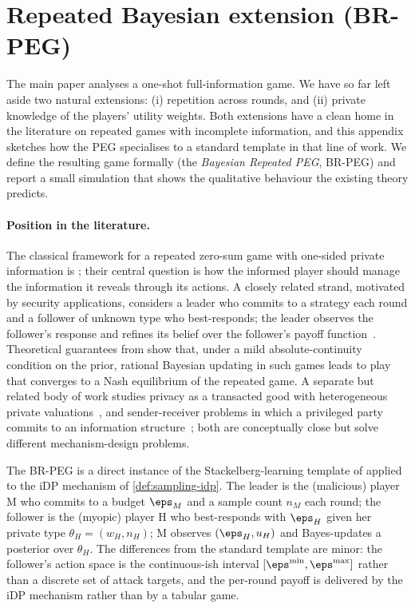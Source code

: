 \section{Repeated Bayesian extension (BR-PEG)}
\label{app:bayesian}

The main paper analyses a one-shot full-information game. We have so far
left aside two natural extensions: (i) repetition across rounds, and (ii)
private knowledge of the players' utility weights. Both extensions have a
clean home in the literature on repeated games with incomplete
information, and this appendix sketches how the PEG specialises to a
standard template in that line of work. We define the resulting game
formally (the \emph{Bayesian Repeated PEG}, BR-PEG) and report a small
simulation that shows the qualitative behaviour the existing theory
predicts.

\paragraph{Position in the literature.}
The classical framework for a repeated zero-sum game with one-sided
private information is \citet{aumann1995repeated}; their central question
is how the informed player should manage the information it reveals
through its actions. A closely related strand, motivated by security
applications, considers a leader who commits to a strategy each round and
a follower of unknown type who best-responds; the leader observes the
follower's response and refines its belief over the follower's payoff
function~\cite{letchford2009learning, blum2014learning,
balcan2015commitment}. Theoretical guarantees from
\citet{kalai1993rational} show that, under a mild absolute-continuity
condition on the prior, rational Bayesian updating in such games leads to
play that converges to a Nash equilibrium of the repeated game. A
separate but related body of work studies privacy as a transacted good
with heterogeneous private valuations~\cite{ghosh2011selling}, and
sender-receiver problems in which a privileged party commits to an
information structure~\cite{kamenica2011bayesian}; both are conceptually
close but solve different mechanism-design problems.

The BR-PEG is a direct instance of the Stackelberg-learning template of
\citet{letchford2009learning, blum2014learning, balcan2015commitment}
applied to the iDP mechanism of \cref{def:sampling-idp}. The leader is
the (malicious) player M who commits to a budget $\eps_M$ and a sample
count $n_M$ each round; the follower is the (myopic) player H who
best-responds with $\eps_H$ given her private type $\theta_H = (w_H, n_H)$;
M observes $(\eps_H, u_H)$ and Bayes-updates a posterior over
$\theta_H$. The differences from the standard template are minor: the
follower's action space is the continuous-ish interval
$[\eps^{\min}, \eps^{\max}]$ rather than a discrete set of attack
targets, and the per-round payoff is delivered by the iDP mechanism
rather than by a tabular game.

